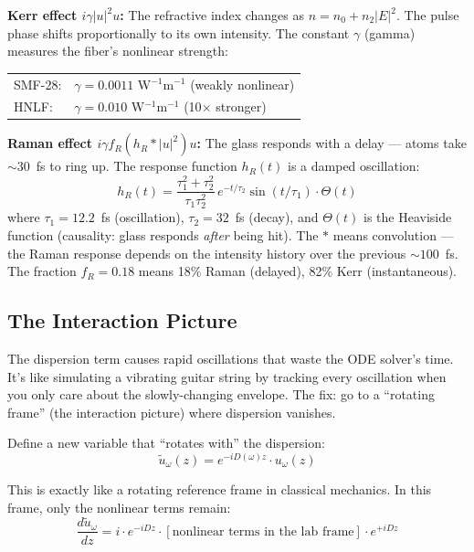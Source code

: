 \documentclass[12pt,a4paper]{article}
\newcommand{\dv}[2]{\frac{d #1}{d #2}}
\begin{document}
\textbf{Kerr effect $i\gamma|u|^2 u$:} The refractive index changes as $n = n_0 + n_2|E|^2$. The pulse phase shifts proportionally to its own intensity. The constant $\gamma$ (gamma) measures the fiber's nonlinear strength:
\begin{center}
\begin{tabular}{ll}
SMF-28: & $\gamma = 0.0011$ W$^{-1}$m$^{-1}$ (weakly nonlinear) \\
HNLF:   & $\gamma = 0.010$ W$^{-1}$m$^{-1}$ (10$\times$ stronger)
\end{tabular}
\end{center}

\textbf{Raman effect $i\gamma f_R(h_R * |u|^2)u$:} The glass responds with a delay --- atoms take ${\sim}30$~fs to ring up. The response function $h_R(t)$ is a damped oscillation:
\begin{equation}
h_R(t) = \frac{\tau_1^2 + \tau_2^2}{\tau_1\tau_2^2}\,e^{-t/\tau_2}\sin(t/\tau_1)\cdot\Theta(t)
\end{equation}
where $\tau_1 = 12.2$~fs (oscillation), $\tau_2 = 32$~fs (decay), and $\Theta(t)$ is the Heaviside function (causality: glass responds \emph{after} being hit). The $*$ means convolution --- the Raman response depends on the intensity history over the previous ${\sim}100$~fs. The fraction $f_R = 0.18$ means 18\% Raman (delayed), 82\% Kerr (instantaneous).

\subsection{The Interaction Picture}

\begin{intuition}
The dispersion term causes rapid oscillations that waste the ODE solver's time. It's like simulating a vibrating guitar string by tracking every oscillation when you only care about the slowly-changing envelope. The fix: go to a ``rotating frame'' (the interaction picture) where dispersion vanishes.
\end{intuition}

Define a new variable that ``rotates with'' the dispersion:
\begin{equation}
\tilde{u}_\omega(z) = e^{-iD(\omega)z}\cdot u_\omega(z)
\end{equation}

This is exactly like a rotating reference frame in classical mechanics. In this frame, only the nonlinear terms remain:
\begin{equation}
\dv{\tilde{u}_\omega}{z} = i\cdot e^{-iDz}\cdot[\text{nonlinear terms in the lab frame}]\cdot e^{+iDz}
\end{equation}
\end{document}
